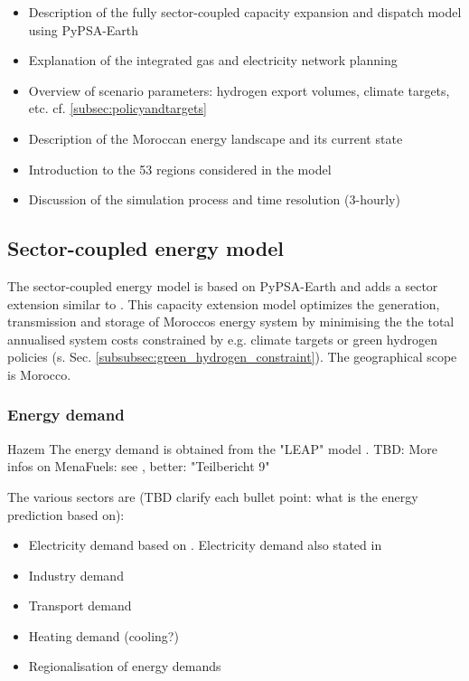 \begin{itemize}
    \item Description of the fully sector-coupled capacity expansion and dispatch model using PyPSA-Earth
    \item Explanation of the integrated gas and electricity network planning
    \item Overview of scenario parameters: hydrogen export volumes, climate targets, etc. cf. \ref{subsec:policyandtargets}
    \item Description of the Moroccan energy landscape and its current state
    \item Introduction to the 53 regions considered in the model
    \item Discussion of the simulation process and time resolution (3-hourly)
\end{itemize}

\subsection{Sector-coupled energy model}
\label{subsec:moroccan_model}

The sector-coupled energy model is based on PyPSA-Earth \cite{Parzen2022} and adds a sector extension similar to \cite{Brown2018a}.
This capacity extension model optimizes the generation, transmission and storage of Moroccos energy system by minimising the the total annualised system costs
constrained by e.g. climate targets or green hydrogen policies (s. Sec. \ref{subsubsec:green_hydrogen_constraint}). The geographical scope is Morocco.

\subsubsection{Energy demand}
Hazem
The energy demand is obtained from the "LEAP" model \cite{Heaps2022}.
TBD: More infos on MenaFuels: see \cite[p. 35]{Ersoy2022}, better: "Teilbericht 9"

The various sectors are (TBD clarify each bullet point: what is the energy prediction based on):
\begin{itemize}
    \item Electricity demand based on \cite{Parzen2022}. Electricity demand also stated in \cite[primary source 25]{Boulakhbar2020}
    \item Industry demand
    \item Transport demand
    \item Heating demand (cooling?) 
    \item Regionalisation of energy demands
\end{itemize}



